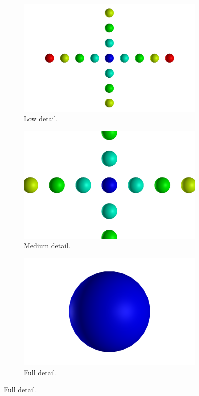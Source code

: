 \begin{figure}
  \begin{center}
    \begin{subfigure}{0.3\textwidth}
      \includegraphics[width=\textwidth]{assets/images/lod/1}
      \caption{Low detail.}
      \label{fig:lod_1}
    \end{subfigure}
    \begin{subfigure}{0.3\textwidth}
      \includegraphics[width=\textwidth]{assets/images/lod/2}
      \caption{Medium detail.}
      \label{fig:lod_2}
    \end{subfigure}
    \begin{subfigure}{0.3\textwidth}
      \includegraphics[width=\textwidth]{assets/images/lod/3}
      \caption{Full detail.}
      \label{fig:lod_3}
    \end{subfigure}
    

\end{center}
\end{figure}
